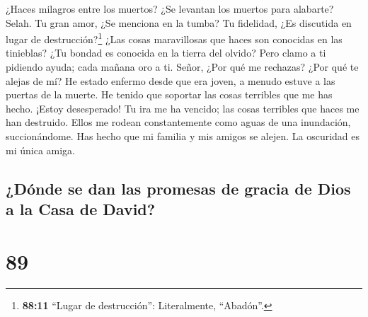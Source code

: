  ¿Haces milagros entre los muertos? ¿Se levantan los
muertos para alabarte? Selah.  Tu gran amor, ¿Se menciona
en la tumba? Tu fidelidad, ¿Es discutida en lugar de
destrucción?\footnote{\textbf{88:11} ``Lugar de destrucción'':
  Literalmente, ``Abadón''.}  ¿Las cosas maravillosas que
haces son conocidas en las tinieblas? ¿Tu bondad es conocida en la
tierra del olvido?  Pero clamo a ti pidiendo ayuda; cada
mañana oro a ti.  Señor, ¿Por qué me rechazas? ¿Por qué
te alejas de mí?  He estado enfermo desde que era joven,
a menudo estuve a las puertas de la muerte. He tenido que soportar las
cosas terribles que me has hecho. ¡Estoy desesperado!  Tu
ira me ha vencido; las cosas terribles que haces me han destruido.
 Ellos me rodean constantemente como aguas de una
inundación, succionándome.  Has hecho que mi familia y
mis amigos se alejen. La oscuridad es mi única amiga.

\hypertarget{duxf3nde-se-dan-las-promesas-de-gracia-de-dios-a-la-casa-de-david}{%
\subsection{¿Dónde se dan las promesas de gracia de Dios a la Casa de
David?}\label{duxf3nde-se-dan-las-promesas-de-gracia-de-dios-a-la-casa-de-david}}

\hypertarget{section-88}{%
\section{89}\label{section-88}}

